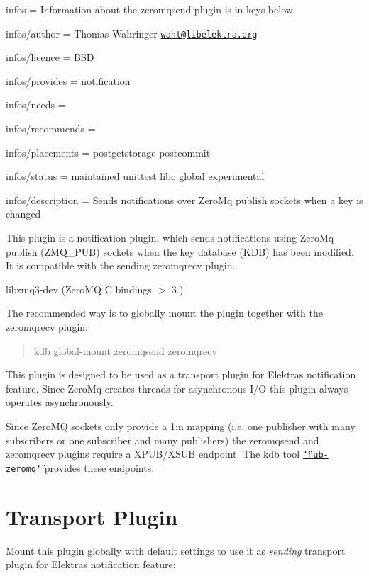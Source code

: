 
\begin{DoxyItemize}
\item infos = Information about the zeromqsend plugin is in keys below
\item infos/author = Thomas Wahringer \href{mailto:waht@libelektra.org}{\tt waht@libelektra.\+org}
\item infos/licence = B\+SD
\item infos/provides = notification
\item infos/needs =
\item infos/recommends =
\item infos/placements = postgetstorage postcommit
\item infos/status = maintained unittest libc global experimental
\item infos/description = Sends notifications over Zero\+Mq publish sockets when a key is changed
\end{DoxyItemize}

This plugin is a notification plugin, which sends notifications using Zero\+Mq publish ({\ttfamily Z\+M\+Q\+\_\+\+P\+UB}) sockets when the key database (K\+DB) has been modified. It is compatible with the sending zeromqrecv plugin.


\begin{DoxyItemize}
\item {\ttfamily libzmq3-\/dev} (Zero\+MQ C bindings $>$ 3.)
\end{DoxyItemize}

The recommended way is to globally mount the plugin together with the zeromqrecv plugin\+:

\begin{quote}
kdb global-\/mount zeromqsend zeromqrecv \end{quote}


This plugin is designed to be used as a transport plugin for Elektra\textquotesingle{}s notification feature. Since Zero\+Mq creates threads for asynchronous I/O this plugin always operates asynchronously.

Since Zero\+MQ sockets only provide a 1\+:n mapping (i.\+e. one publisher with many subscribers or one subscriber and many publishers) the {\ttfamily zeromqsend} and {\ttfamily zeromqrecv} plugins require a X\+P\+U\+B/\+X\+S\+UB endpoint. The kdb tool \href{https://www.libelektra.org/tools/hub-zeromq}{\tt \char`\"{}hub-\/zeromq\char`\"{}} provides these endpoints.\hypertarget{autotoc_md1004_autotoc_md1007}{}\section{Transport Plugin}\label{autotoc_md1004_autotoc_md1007}
Mount this plugin globally with default settings to use it as {\itshape sending} transport plugin for Elektra\textquotesingle{}s notification feature\+:


